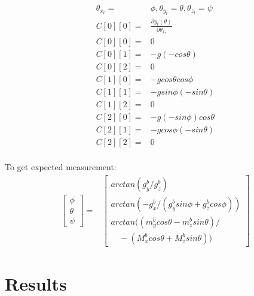 \documentclass[conference]{IEEEtran}
\begin{document}
\begin{align*}
\theta_{x_{t}}=&\phi, \theta_{y_{t}}=\theta, \theta_{z_{t}}=\psi \\
C[0][0] =& \frac{\partial y_t(\theta)}{\partial\theta_{x_{t}}}\\
C[0][0] = & 0 \\
C[0][1] = & -g (-cos\theta) \\
C[0][2] = & 0 \\
C[1][0] = & -g cos\theta cos\phi \\
C[1][1] = & -g sin\phi(-sin\theta)\\
C[1][2] = & 0\\
C[2][0] = & -g (-sin\phi) cos\theta\\
C[2][1] = & -g cos\phi (-sin\theta)\\
C[2][2] = & 0\\
\end{align*}


To get expected measurement:
\begin{align}
\begin{bmatrix} \phi \\ \theta \\ \psi \end{bmatrix} =& \begin{bmatrix} arctan( g_y^b / g_z^b )\\
													arctan( - g_x^b / (g_y^b sin\phi + g_z^b cos\phi))\\
													arctan((m_y^b cos\theta - m_z^b sin\theta)  / \\
\quad - (M_x^b cos\theta + M_z^b sin\theta))
\end{bmatrix} \nonumber
\end{align}



\section{Results}
\end{document}

